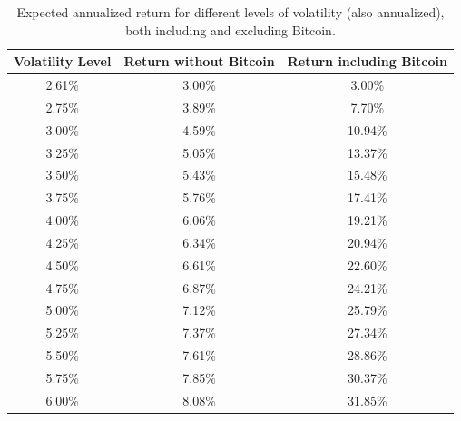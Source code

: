 \begin{table}
	\small
	\centering
	\caption[Markowitz efficient frontier on volatility]{Expected annualized return for different levels of volatility (also annualized), both including and excluding Bitcoin.}
	\label{tab:markowitz_ret_on_vol}
\begin{tabular}{ccc}

Volatility Level & Return without Bitcoin & Return including Bitcoin \\
\midrule
2.61\% & 3.00\% & 3.00\% \\
2.75\% & 3.89\% & 7.70\% \\
3.00\% & 4.59\% & 10.94\% \\
3.25\% & 5.05\% & 13.37\% \\
3.50\% & 5.43\% & 15.48\% \\
3.75\% & 5.76\% & 17.41\% \\
4.00\% & 6.06\% & 19.21\% \\
4.25\% & 6.34\% & 20.94\% \\
4.50\% & 6.61\% & 22.60\% \\
4.75\% & 6.87\% & 24.21\% \\
5.00\% & 7.12\% & 25.79\% \\
5.25\% & 7.37\% & 27.34\% \\
5.50\% & 7.61\% & 28.86\% \\
5.75\% & 7.85\% & 30.37\% \\
6.00\% & 8.08\% & 31.85\% \\
\midrule
\end{tabular}
\end{table}

